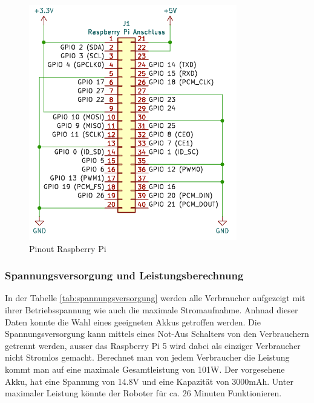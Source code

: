 \begin{figure}[h]
\begin{minipage}[b]{0.45\textwidth}
  \includegraphics[width=\textwidth]{assets/ET/Software/RaspyHat_Pinout.png}
  \caption{Pinout Raspberry Pi}
  \label{fig:Pinout Raspy Hat}
\end{minipage}
\end{figure}


\subsubsection{Spannungsversorgung und Leistungsberechnung}




In der Tabelle \ref{tab:spannungsversorgung} werden alle Verbraucher aufgezeigt mit ihrer Betriebsspannung wie auch die maximale Stromaufnahme. Anhnad dieser Daten konnte die Wahl eines geeigneten Akkus getroffen werden. Die Spannungsversorgung kann mittels eines Not-Aus Schalters von den Verbrauchern getrennt werden, ausser das Raspberry Pi 5 wird dabei als einziger Verbraucher nicht Stromlos gemacht. Berechnet man von jedem Verbraucher die Leistung kommt man auf eine maximale Gesamtleistung von 101W. Der vorgesehene Akku, hat eine Spannung von 14.8V und eine Kapazität von 3000mAh. Unter maximaler Leistung könnte der Roboter für ca. 26 Minuten Funktionieren.

